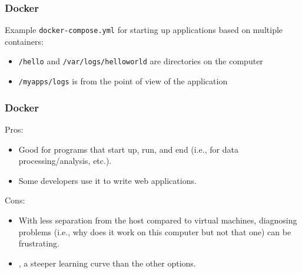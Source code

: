 \documentclass[11pt,aspectratio=43,ignorenonframetext,t]{beamer}
\begin{document}
\begin{frame}

\frametitle{Docker}

Example {\texttt{docker-compose.yml}} for starting up applications based on multiple containers:
\begin{figure}
  \centering
  {}
\end{figure}

\begin{itemize}
  \item {\texttt{/hello}} and {\texttt{/var/logs/helloworld}} are directories on the {} computer
  \item {\texttt{/myapps/logs}} is from the point of view of the application
\end{itemize}

\end{frame}


\begin{frame}

\frametitle{Docker}

Pros:
\begin{itemize}
  \item Good for programs that start up, run, and end (i.e., for data processing/analysis, etc.).
  \item Some developers use it to write web applications.
\end{itemize}

Cons:
\begin{itemize}
  \item With less separation from the host compared to virtual machines, diagnosing problems (i.e., why does it work on this computer but not that one) can be frustrating.
  \item {}, a steeper learning curve than the other options.
\end{itemize}

\end{frame}
\end{document}
